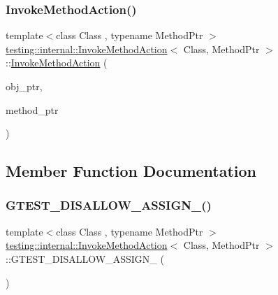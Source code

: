 \subsubsection{\texorpdfstring{InvokeMethodAction()}{InvokeMethodAction()}}
{\footnotesize\ttfamily template$<$class Class , typename Method\+Ptr $>$ \\
\mbox{\hyperlink{structtesting_1_1internal_1_1_invoke_method_action}{testing\+::internal\+::\+Invoke\+Method\+Action}}$<$ Class, Method\+Ptr $>$\+::\mbox{\hyperlink{structtesting_1_1internal_1_1_invoke_method_action}{Invoke\+Method\+Action}} (\begin{DoxyParamCaption}\item[{Class $\ast$}]{obj\+\_\+ptr,  }\item[{Method\+Ptr}]{method\+\_\+ptr }\end{DoxyParamCaption})\hspace{0.3cm}{\ttfamily [inline]}}



\subsection{Member Function Documentation}
\mbox{\label{structtesting_1_1internal_1_1_invoke_method_action_ade6d5b1ee276aedac65290465a447a87}} 
\subsubsection{\texorpdfstring{GTEST\_DISALLOW\_ASSIGN\_()}{GTEST\_DISALLOW\_ASSIGN\_()}}
{\footnotesize\ttfamily template$<$class Class , typename Method\+Ptr $>$ \\
\mbox{\hyperlink{structtesting_1_1internal_1_1_invoke_method_action}{testing\+::internal\+::\+Invoke\+Method\+Action}}$<$ Class, Method\+Ptr $>$\+::G\+T\+E\+S\+T\+\_\+\+D\+I\+S\+A\+L\+L\+O\+W\+\_\+\+A\+S\+S\+I\+G\+N\+\_\+ (\begin{DoxyParamCaption}\item[{\mbox{\hyperlink{structtesting_1_1internal_1_1_invoke_method_action}{Invoke\+Method\+Action}}$<$ Class, Method\+Ptr $>$}]{ }\end{DoxyParamCaption})\hspace{0.3cm}{\ttfamily [private]}}

